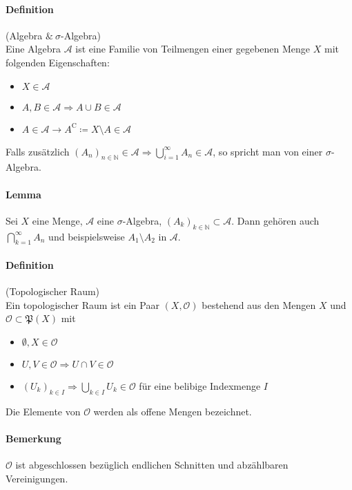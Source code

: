 \documentclass[12pt,a4paper,fleqn]{article}
\begin{document}
\paragraph{Definition}(Algebra $\&\ \sigma$-Algebra)\\
Eine Algebra $\mathcal{A}$ ist eine Familie von Teilmengen einer gegebenen Menge $\mathit{X}$ mit folgenden Eigenschaften:
\begin{itemize}
\item $\mathit{X} \in \mathcal{A}$
\item $A, B \in \mathcal{A} \Rightarrow A\cup B \in \mathcal{A}$
\item $\mathit{A} \in \mathcal{A} \rightarrow \mathit{A}^\mathrm{C} \coloneqq \mathit{X}\setminus\mathit{A} \in \mathcal{A}$
\end{itemize}
Falls zusätzlich $(\mathit{A}_n)_{n \in \mathbb{N}} \in \mathcal{A} \Rightarrow \bigcup_{i=1}^\infty A_n \in \mathcal{A}$, so spricht man von einer $\sigma$-Algebra.

\paragraph{Lemma}
Sei $\mathit{X}$ eine Menge, $\mathcal{A}$ eine $\sigma$-Algebra, $(\mathit{A}_k)_{k \in \mathbb{N}} \subset \mathcal{A}$. Dann gehören auch $\bigcap^\infty_{k=1} A_n$ und beispielsweise $A_1 \setminus A_2$ in $\mathcal{A}$.

\paragraph{Definition}(Topologischer Raum)\\
Ein topologischer Raum ist ein Paar $(X, \mathcal{O})$ bestehend aus den Mengen $X$ und $\mathcal{O} \subset \mathfrak{P}(X)$ mit
\begin{itemize}
\item $\emptyset, X \in \mathcal{O}$
\item $U, V \in \mathcal{O} \Rightarrow U \cap V \in \mathcal{O}$
\item $(U_k)_{k \in I} \Rightarrow \bigcup_{k \in I} U_k \in \mathcal{O}$
für eine belibige Indexmenge $I$
\end{itemize} 
Die Elemente von $\mathcal{O}$ werden als offene Mengen bezeichnet.

\paragraph{Bemerkung} $\mathcal{O}$ ist abgeschlossen bezüglich endlichen Schnitten und abzählbaren Vereinigungen.
\end{document}
